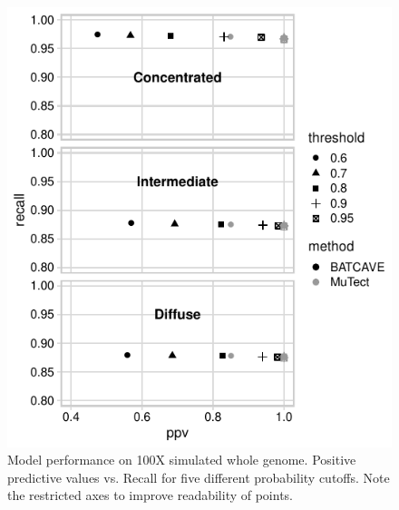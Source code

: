 \documentclass[a4,center,fleqn]{NAR}
\begin{document}
\clearpage
\begin{figure}
  \begin{center}
  \includegraphics{figures/ppv_wgs.pdf}
  \end{center}
  \caption{Model performance on 100X simulated whole genome. 
  Positive predictive values vs. Recall for five different probability cutoffs. 
  Note the restricted axes to improve readability of points.}
\label{NAR-ppv_wgs_fig}
\end{figure}
\end{document}
